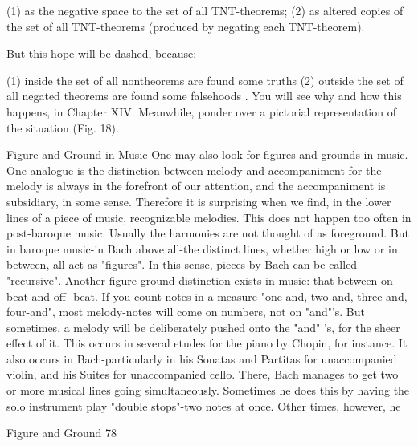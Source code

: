      (1) as the negative space to the set of all TNT-theorems;
     (2) as altered copies of the set of all TNT-theorems (produced by negating each
           TNT-theorem).

       But this hope will be dashed, because:

        (1) inside the set of all nontheorems are found some truths
        (2) outside the set of all negated theorems are found some falsehoods
        .
You will see why and how this happens, in Chapter XIV. Meanwhile, ponder over a
pictorial representation of the situation (Fig. 18).

                              Figure and Ground in Music
One may also look for figures and grounds in music. One analogue is the distinction
between melody and accompaniment-for the melody is always in the forefront of our
attention, and the accompaniment is subsidiary, in some sense. Therefore it is surprising
when we find, in the lower lines of a piece of music, recognizable melodies. This does
not happen too often in post-baroque music. Usually the harmonies are not thought of as
foreground. But in baroque music-in Bach above all-the distinct lines, whether high or
low or in between, all act as "figures". In this sense, pieces by Bach can be called
"recursive".
        Another figure-ground distinction exists in music: that between on-beat and off-
beat. If you count notes in a measure "one-and, two-and, three-and, four-and", most
melody-notes will come on numbers, not on "and"'s. But sometimes, a melody will be
deliberately pushed onto the "and" 's, for the sheer effect of it. This occurs in several
etudes for the piano by Chopin, for instance. It also occurs in Bach-particularly in his
Sonatas and Partitas for unaccompanied violin, and his Suites for unaccompanied cello.
There, Bach manages to get two or more musical lines going simultaneously. Sometimes
he does this by having the solo instrument play "double stops"-two notes at once. Other
times, however, he




Figure and Ground                                                                     78

